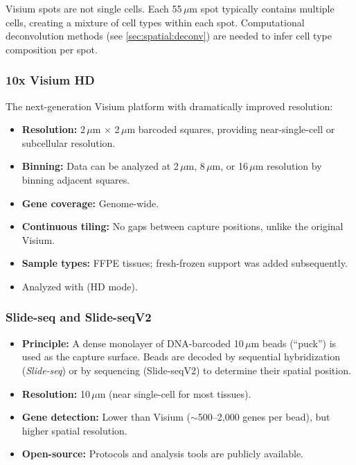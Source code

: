 \begin{warningbox}
Visium spots are not single cells. Each 55\,$\mu$m spot typically contains
multiple cells, creating a mixture of cell types within each spot. Computational
deconvolution methods (see \cref{sec:spatial:deconv}) are needed to infer
cell type composition per spot.
\end{warningbox}

\subsubsection{10x Visium HD}

The next-generation Visium platform with dramatically improved resolution:

\begin{itemize}[nosep]
  \item \textbf{Resolution:} 2\,$\mu$m $\times$ 2\,$\mu$m barcoded squares,
    providing near-single-cell or subcellular resolution.
  \item \textbf{Binning:} Data can be analyzed at 2\,$\mu$m, 8\,$\mu$m, or
    16\,$\mu$m resolution by binning adjacent squares.
  \item \textbf{Gene coverage:} Genome-wide.
  \item \textbf{Continuous tiling:} No gaps between capture positions, unlike
    the original Visium.
  \item \textbf{Sample types:} FFPE tissues; fresh-frozen support was added
    subsequently.
  \item Analyzed with  (HD mode).
\end{itemize}

\subsubsection{Slide-seq and Slide-seqV2}

\begin{itemize}[nosep]
  \item \textbf{Principle:} A dense monolayer of DNA-barcoded 10\,$\mu$m beads
    (``puck'') is used as the capture surface. Beads are decoded by sequential
    hybridization (\textit{Slide-seq}) or by sequencing (Slide-seqV2) to
    determine their spatial position.
  \item \textbf{Resolution:} 10\,$\mu$m (near single-cell for most tissues).
  \item \textbf{Gene detection:} Lower than Visium ($\sim$500--2,000 genes per
    bead), but higher spatial resolution.
  \item \textbf{Open-source:} Protocols and analysis tools are publicly
    available.
\end{itemize}

